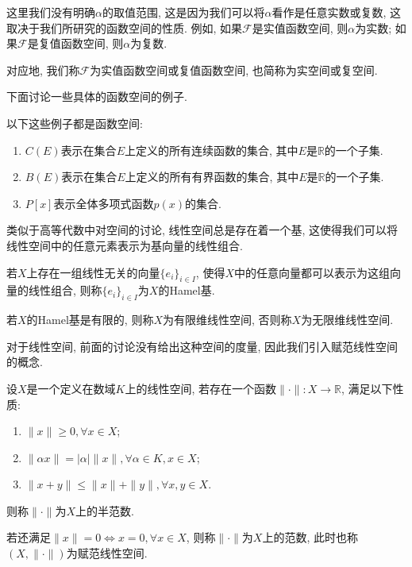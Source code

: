 \documentclass[theorem=false,mathfont=none,openany,sub3section]{easybook}
\begin{document}
\begin{remark}
  这里我们没有明确$\alpha$的取值范围, 这是因为我们可以将$\alpha$看作是任意实数或复数, 这取决于我们所研究的函数空间的性质. 例如, 如果$\mathcal{F}$是实值函数空间, 则$\alpha$为实数; 如果$\mathcal{F}$是复值函数空间, 则$\alpha$为复数.\par
  对应地, 我们称$\mathcal{F}$为实值函数空间或复值函数空间, 也简称为实空间或复空间.\par
\end{remark}

下面讨论一些具体的函数空间的例子.\par

\begin{example}
  以下这些例子都是函数空间:\par
  \begin{enumerate}
    \item $C(E)$表示在集合$E$上定义的所有连续函数的集合, 其中$E$是$\mathbb{R}$的一个子集.\par
    \item $B(E)$表示在集合$E$上定义的所有有界函数的集合, 其中$E$是$\mathbb{R}$的一个子集.\par
    \item $P[x]$表示全体多项式函数$p(x)$的集合.\par
  \end{enumerate}
\end{example}

类似于高等代数中对空间的讨论, 线性空间总是存在着一个基, 这使得我们可以将线性空间中的任意元素表示为基向量的线性组合.\par

\begin{definition}
  若$X$上存在一组线性无关的向量$\{e_i\}_{i \in I}$, 使得$X$中的任意向量都可以表示为这组向量的线性组合, 则称$\{e_i\}_{i \in I}$为$X$的Hamel基.\par
  若$X$的Hamel基是有限的, 则称$X$为有限维线性空间, 否则称$X$为无限维线性空间.\par
\end{definition}

对于线性空间, 前面的讨论没有给出这种空间的度量, 因此我们引入赋范线性空间的概念.\par

\begin{definition}
  设$X$是一个定义在数域$K$上的线性空间, 若存在一个函数$\|\cdot\|: X \to \mathbb{R}$, 满足以下性质:\par
  \begin{enumerate}
    \item $\|x\| \geqslant 0, \forall x \in X$;
    \item $\|\alpha x\| = |\alpha| \|x\|, \forall \alpha \in K, x \in X$;
    \item $\|x+y\| \leqslant \|x\| + \|y\|, \forall x,y \in X$.
  \end{enumerate}
  则称$\|\cdot \|$为$X$上的半范数.\par
  若还满足$\|x\| = 0 \Leftrightarrow x = 0, \forall x \in X$, 则称$\|\cdot \|$为$X$上的范数, 此时也称$(X,\|\cdot \|)$为赋范线性空间.\par
\end{definition}
\end{document}
